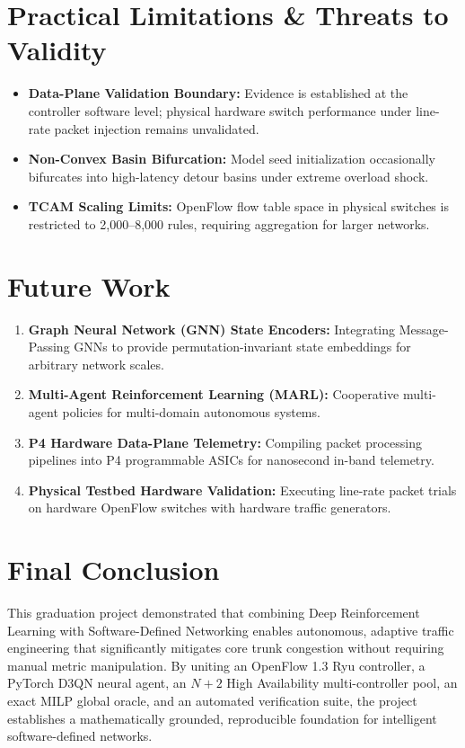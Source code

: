 \documentclass[12pt,a4paper,oneside]{report}
\begin{document}
\section{Practical Limitations \& Threats to Validity}
\begin{itemize}[leftmargin=8mm]
  \item \textbf{Data-Plane Validation Boundary:} Evidence is established at the controller software level; physical hardware switch performance under line-rate packet injection remains unvalidated.
  \item \textbf{Non-Convex Basin Bifurcation:} Model seed initialization occasionally bifurcates into high-latency detour basins under extreme overload shock.
  \item \textbf{TCAM Scaling Limits:} OpenFlow flow table space in physical switches is restricted to 2,000--8,000 rules, requiring aggregation for larger networks.
\end{itemize}

\section{Future Work}
\begin{enumerate}
  \item \textbf{Graph Neural Network (GNN) State Encoders:} Integrating Message-Passing GNNs to provide permutation-invariant state embeddings for arbitrary network scales.
  \item \textbf{Multi-Agent Reinforcement Learning (MARL):} Cooperative multi-agent policies for multi-domain autonomous systems.
  \item \textbf{P4 Hardware Data-Plane Telemetry:} Compiling packet processing pipelines into P4 programmable ASICs for nanosecond in-band telemetry.
  \item \textbf{Physical Testbed Hardware Validation:} Executing line-rate packet trials on hardware OpenFlow switches with hardware traffic generators.
\end{enumerate}

\section{Final Conclusion}
This graduation project demonstrated that combining Deep Reinforcement Learning with Software-Defined Networking enables autonomous, adaptive traffic engineering that significantly mitigates core trunk congestion without requiring manual metric manipulation. By uniting an OpenFlow 1.3 Ryu controller, a PyTorch D3QN neural agent, an $N+2$ High Availability multi-controller pool, an exact MILP global oracle, and an automated verification suite, the project establishes a mathematically grounded, reproducible foundation for intelligent software-defined networks.
\end{document}
